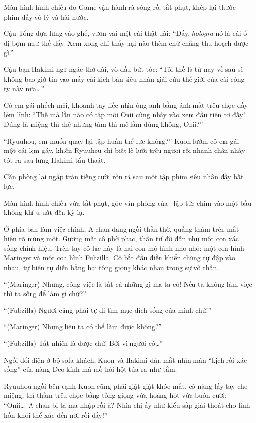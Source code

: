 \documentclass[../main.tex]{subfiles}
\begin{document}
Màn hình hình chiếu do Game vận hành rà sóng rồi tắt phụt, khép lại thước phim đầy vô lý và hài hước.

Cậu Tổng dựa lưng vào ghế, vươn vai một cái thật dài: ``Đấy, \textit{hologra} nó là cái ổ dị bợm như thế đấy. Xem xong chỉ thấy hại não thêm chứ chẳng thu hoạch được gì.''

Cậu bạn Hakimi ngơ ngác thở dài, vò đầu bứt tóc: ``Tôi thề là từ nay về sau sẽ không bao giờ tin vào mấy cái kịch bản siêu nhân giải cứu thế giới của cái công ty này nữa\dots''

Cô em gái nhếch môi, khoanh tay liếc nhìn ông anh bằng ánh mắt trêu chọc đầy lém lỉnh: ``Thế mà lần nào có tập mới Onii cũng nhảy vào xem đầu tiên cơ đấy! Đúng là miệng thì chê nhưng tâm thì mê lắm đúng không, Onii?''

``Ryuuhou, em muốn quay lại tập huấn thể lực không?'' Kuon lườm cô em gái một cái lẹm gáy, khiến Ryuuhou chỉ biết lè lưỡi trêu ngươi rồi nhanh chân nhảy tót ra sau lưng Hakimi tẩu thoát.

Căn phòng lại ngập tràn tiếng cười rộn rã sau một tập phim siêu nhân đầy bất lực.

\omk

Màn hình hình chiếu vừa tắt phụt, góc văn phòng của \hll\ lập tức chìm vào một bầu không khí u uất đến kỳ lạ.

Ở phía bàn làm việc chính, A-chan đang ngồi thẫn thờ, quầng thâm trên mắt hiện rõ mùng một. Gương mặt cô phờ phạc, thần trí đờ đẫn như một con xác sống chính hiệu. Trên tay cô lúc này là hai con mô hình nho nhỏ: một con hình Maringer và một con hình Fubzilla. Cô bắt đầu điều khiển chúng tự đập vào nhau, tự biên tự diễn bằng hai tông giọng khác nhau trong sự vô thần.


``(Maringer) Nhưng, công việc là tất cả những gì mà ta có! Nếu ta không làm viẹc thì ta sống để làm gì chứ?''

``(Fubzilla) Ngươi cũng phải tự đi tìm mục đích sống của mình chứ!''

``(Maringer) Nhưng liệu ta có thể làm được không?''

``(Fubzilla) Tất nhiên là được chứ! Bởi vì ngươi có\dots''

Ngồi đối diện ở bộ sofa khách, Kuon và Hakimi dán mắt nhìn màn ``kịch rối xác sống'' của nàng Đeo kính mà mồ hôi hột túa ra như tắm.

Ryuuhou ngồi bên cạnh Kuon cũng phải giật giật khóe mắt, cô nàng lấy tay che miệng, thì thầm trêu chọc bằng tông giọng vừa hoảng hốt vừa buồn cười: ``Onii\dots\ A-chan bị tà ma nhập rồi à? Nhìn chị ấy như kiểu sắp giải thoát cho linh hồn khỏi thể xác đến nơi rồi đấy!''
\end{document}
